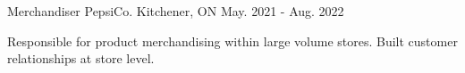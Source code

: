


\begin{cventries}


\cventry
{Merchandiser} %
{PepsiCo.} %
{Kitchener, ON} %
{May. 2021 - Aug. 2022} %
{ %
\begin{cvitems}
\item {Responsible for product merchandising within large volume stores. Built customer relationships at store level.}
\end{cvitems}
}


\end{cventries}